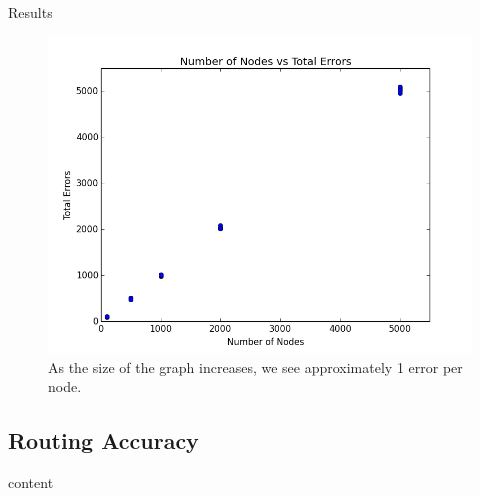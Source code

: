 \documentclass[8pt]{beamer}
\begin{document}
\begin{frame}{Results}
\begin{figure}
	\centering
	\includegraphics[width=0.5\linewidth]{error_rate}
	\caption{As the size of the graph increases, we see approximately 1 error per node.}
	\label{exp_0}
\end{figure}
\end{frame}

\subsection{Routing Accuracy}


\begin{frame}
content
\end{frame}
\end{document}
